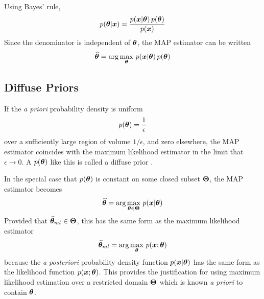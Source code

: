 

Using Bayes' rule,
\begin{equation}
p(\bm{\theta}|\bm{x})=\frac{p(\bm{x}|\bm{\theta})\,p(\bm{\theta})}{p(\bm{x})}
\end{equation}
Since the denominator is independent of $\bm{\theta}$, the MAP estimator can be
written
\begin{equation}
\widehat{\bm{\theta}}=\arg\max_{\bm{\theta}}\,p(\bm{x}|\bm{\theta})\,p(\bm{\theta})
\end{equation}

\subsection{Diffuse Priors}
\label{mp sec:dp}

If the {\em a priori\/} probability density is uniform 
\begin{equation}
p(\bm{\theta})=\frac{1}{\epsilon}	
\end{equation}
over a sufficiently large region of volume $1/\epsilon$, and zero elsewhere,
the MAP estimator coincides with the maximum likelihood estimator in the limit that
$\epsilon\to 0$.  A $p(\bm{\theta})$ like this is called a diffuse prior
\cite{Bar88}.

In the special case that $p(\bm{\theta})$ is constant on some closed subset
$\bm{\Theta}$, the MAP estimator becomes
\begin{equation}
\widehat{\bm{\theta}}=\arg\max_{\bm{\theta}\in\bm{\Theta}}\,p(\bm{x}|\bm{\theta})
\end{equation}
Provided that $\widehat{\bm{\theta}}_{ml}\in\bm{\Theta}$, this has the same form as the maximum 
likelihood estimator
\begin{equation}
\widehat{\bm{\theta}}_{ml}=\arg\max_{\bm{\theta}}\,p(\bm{x};\bm{\theta})
\end{equation}
because the {\em a posteriori\/} probability density function $p(\bm{x}|\bm{\theta})$
has the same form as the likelihood function $p(\bm{x};\bm{\theta})$.
This provides the justification for using maximum likelihood estimation over
a restricted domain $\bm{\Theta}$ which is known {\em a priori\/} to contain $\bm{\theta}$.

